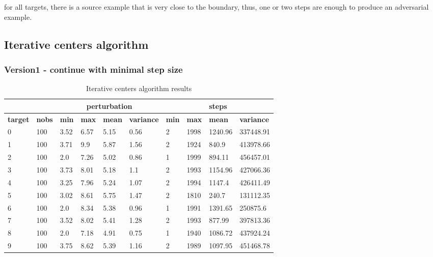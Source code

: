 \documentclass{article}
\begin{document}
for all targets, there is a source example that is very close to the boundary, thus, one or two steps are enough to produce an adversarial example.

\subsection{Iterative centers algorithm}
\subsubsection{Version1 - continue with minimal step size}
\begin{table}[h]
\caption{Iterative centers algorithm results}
\label{tab:iterative_result}
\begin{tabular}{|l|l|l|l|l|l|l|l|l|l|}
\hline
\textbf{}       & \textbf{}     & \multicolumn{4}{c|}{\textbf{perturbation}}                      & \multicolumn{4}{c|}{\textbf{steps}}                             \\ \hline
\textbf{target} & \textbf{nobs} & \textbf{min} & \textbf{max} & \textbf{mean} & \textbf{variance} & \textbf{min} & \textbf{max} & \textbf{mean} & \textbf{variance} \\ \hline
0 & 100  & 3.52     & 6.57     & 5.15      & 0.56          & 2         & 1998      & 1240.96    & 337448.91      \\ \hline
1 & 100  & 3.71     & 9.9      & 5.87      & 1.56          & 2         & 1924      & 840.9      & 413978.66      \\ \hline
2 & 100  & 2.0      & 7.26     & 5.02      & 0.86          & 1         & 1999      & 894.11     & 456457.01      \\ \hline
3 & 100  & 3.73     & 8.01     & 5.18      & 1.1           & 2         & 1993      & 1154.96    & 427066.36      \\ \hline
4 & 100  & 3.25     & 7.96     & 5.24      & 1.07          & 2         & 1994      & 1147.4     & 426411.49      \\ \hline
5 & 100  & 3.02     & 8.61     & 5.75      & 1.47          & 2         & 1810      & 240.7      & 131112.35      \\ \hline
6 & 100  & 2.0      & 8.34     & 5.38      & 0.96          & 1         & 1991      & 1391.65    & 250875.6       \\ \hline
7 & 100  & 3.52     & 8.02     & 5.41      & 1.28          & 2         & 1993      & 877.99     & 397813.36      \\ \hline
8 & 100  & 2.0      & 7.18     & 4.91      & 0.75          & 1         & 1940      & 1086.72    & 437924.24      \\ \hline
9 & 100  & 3.75     & 8.62     & 5.39      & 1.16          & 2         & 1989      & 1097.95    & 451468.78      \\ \hline
\end{tabular}
\end{table}
\end{document}
